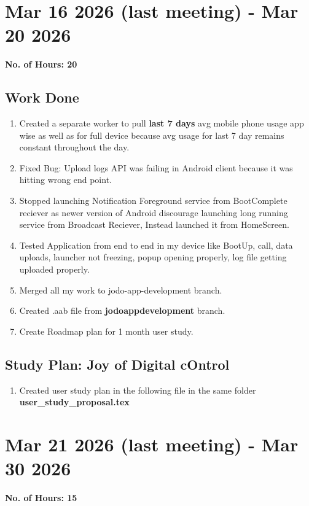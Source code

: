\documentclass[12pt]{article}
\begin{document}
\section{Mar 16 2026 (last meeting) - Mar 20 2026}
{\bf No. of Hours: 20}
\subsection{Work Done}
\begin{enumerate}
    \item Created a separate worker to pull \textbf{last 7 days} avg mobile
    phone usage app wise as well as for full device because avg usage for last 7 day remains constant throughout the day.
    \item Fixed Bug: Upload logs API was failing in Android client because it was hitting wrong end point.
    \item Stopped launching Notification Foreground service from BootComplete reciever as newer version of Android discourage launching long running service from Broadcast Reciever, Instead launched it from HomeScreen.
    \item Tested Application from end to end in my device like BootUp, call, data uploads, launcher not freezing, popup opening properly, log file getting uploaded properly.
    \item Merged all my work to jodo-app-development branch.
    \item Created .aab file from \textbf{jodo\-app\-development} branch.
    \item Create Roadmap plan for 1 month user study.
\end{enumerate}
\subsection{Study Plan: Joy of Digital cOntrol}
\begin{enumerate}
    \item Created user study plan in the  following file in the same folder \textbf{user\_study\_proposal.tex}
\end{enumerate}

\section{Mar 21 2026 (last meeting) - Mar 30 2026}
{\bf No. of Hours: 15}
\end{document}
